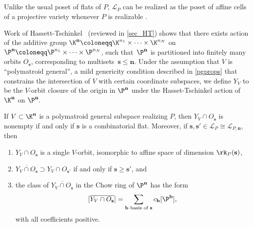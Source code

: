 
\subsection{} Unlike the usual poset of flats of $P$, $\mathcal L_P$ can be realized as the poset of affine cells of a projective variety whenever $P$ is realizable . 

Work of Hassett-Tschinkel~\cite{HT99} (reviewed in \cref{sec_HT}) shows that there exists action of the additive group $\K^{\mathbf n} \coloneqq \K^{n_1} \times \cdots \times \K^{n_N}$ on $\P^{\mathbf n} \coloneqq \P^{n_1} \times \cdots \times \P^{n_N}$, such that~$\P^{\mathbf n}$ is partitioned into finitely many orbits $O_{\mathbf s}$, corresponding to multisets~$\mathbf s \leq \mathbf n$.
Under the assumption that $V$ is ``polymatroid general'', a mild genericity condition described in \cref{pgprops} that constrains the intersection of $V$ with certain coordinate subspaces, we define $Y_V$ to be the $V$-orbit closure of the origin in $\P^{\mathbf n}$ under the Hasset-Tschinkel action of $\K^{\mathbf n}$ on $\P^{\mathbf{n}}.$
\begin{theo}\label{main:stratification}
  If $V \subset \K^{\mathbf n}$ is a polymatroid general subspace realizing $P$, then $Y_V \cap O_{\mathbf s}$ is nonempty if and only if $\mathbf s$ is a combinatorial flat.
  Moreover, if $\mathbf s, \mathbf s' \in \mathcal L_P \cong \mathcal L_{P, \mathbf n}$, then
  \begin{enumerate}
  \item \label{main:stratification:orbit} $Y_V \cap O_{\mathbf s}$ is a single $V$-orbit, isomorphic to affine space of dimension $\rk_P(\mathbf s)$,
  \item \label{main:stratification:poset} $\overline{Y_V \cap O_{\mathbf s}} \supset Y_V \cap O_{\mathbf s'}$ if and only if $\mathbf s \geq \mathbf s'$, and
  \item \label{main:stratification:class} the class of $\overline{Y_V \cap O_{\mathbf s}}$ in the Chow ring of $\P^{\mathbf n}$ has the form
    \[
      [\overline{Y_V \cap O_{\mathbf s}}] = \sum_{\mathbf b \text{ basis of $\mathbf s$}} c_{\mathbf b} [\P^{\mathbf b}],
    \]
    with all coefficients positive.
  \end{enumerate}
\end{theo}

